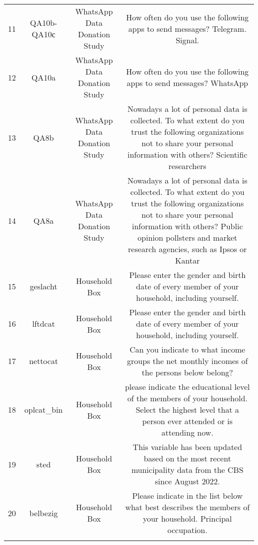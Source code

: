 \begin{table}[!htbp]
\begin{tabular}{@{\extracolsep{5pt}} cccc}
11 & QA10b-QA10с & WhatsApp Data Donation Study & How often do you use the following apps to send messages? Telegram. Signal. \\ 
12 & QA10a & WhatsApp Data Donation Study & How often do you use the following apps to send messages? WhatsApp \\ 
13 & QA8b & WhatsApp Data Donation Study & Nowadays a lot of personal data is collected. To what extent do you trust the following organizations not to share your personal information with others? Scientific researchers \\ 
14 & QA8a & WhatsApp Data Donation Study & Nowadays a lot of personal data is collected. To what extent do you trust the following organizations not to share your personal information with others? Public opinion pollsters and market research agencies, such as Ipsos or Kantar \\ 
15 & geslacht & Household Box & Please enter the gender and birth date of every member of your household, including yourself. \\ 
16 & lftdcat & Household Box & Please enter the gender and birth date of every member of your household, including yourself. \\ 
17 & nettocat & Household Box & Can you indicate to what income groups the net monthly incomes of the persons below belong? \\ 
18 & oplcat\_bin & Household Box & please indicate the educational level of the members of your household. Select the highest level that a person ever attended or is attending now. \\ 
19 & sted & Household Box & This variable has been updated based on the most recent municipality data from the CBS since August 2022. \\ 
20 & belbezig & Household Box & Please indicate in the list below what best describes the members of your household. Principal occupation. \\ 
\hline \\[-1.8ex] 
\end{tabular} 
\end{table} 
